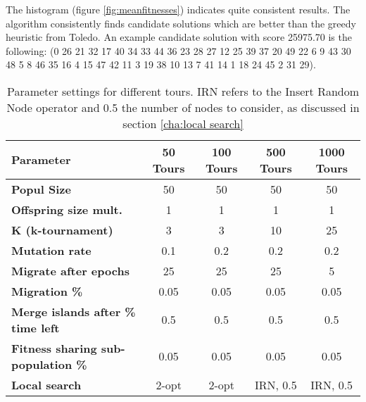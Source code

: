 \documentclass[a4paper,10pt]{article}
\newcommand{\ReplaceMe}[1]{{\color{blue}#1}}
\begin{document}
	The histogram (figure \ref{fig:meanfitnesses}) indicates quite consistent results. The algorithm consistently finds candidate solutions which are better than the greedy heuristic from Toledo.
	An example candidate solution with score 25975.70 is the following: (0 26 21	32	17	40	34	33	44	36	23	28	27	12	25	39	37	20	49	22	6	9	43	30	48	5	8	46	35	16	4	15	47	42	11	3	19	38	10	13	7	41	14	1	18	24	45	2	31	29).


	
	
	\begin{table}[ht]
		\centering
		\small
		\begin{tabular}{|l|c|c|c|c|}
			\hline
			\textbf{Parameter} & \textbf{50 Tours} & \textbf{100 Tours} & \textbf{500 Tours} & \textbf{1000 Tours} \\
			\hline
			\textbf{Popul Size} & 50 & 50 & 50 & 50 \\
			\textbf{Offspring size mult.} & 1 & 1 & 1 & 1 \\
			\textbf{K (k-tournament)} & 3 & 3 & 10 & 25 \\
			\textbf{Mutation rate} & 0.1 & 0.2 & 0.2 & 0.2 \\
			\textbf{Migrate after epochs} & 25 & 25 & 25 & 5 \\
			\textbf{Migration \%} & 0.05 & 0.05 & 0.05 & 0.05 \\
			\textbf{Merge islands after \% time left} & 0.5 & 0.5 & 0.5 & 0.5 \\
			\textbf{Fitness sharing sub-population \%} & 0.05 & 0.05 & 0.05 & 0.05 \\
			\textbf{Local search} & 2-opt & 2-opt & IRN, 0.5 & IRN, 0.5 \\
			\hline
		\end{tabular}
		\caption{Parameter settings for different tours. IRN refers to the Insert Random Node operator and 0.5 the number of nodes to consider, as discussed in section \ref{cha:local search}}
		\label{tbl:params}
	\end{table}
	
\end{document}
